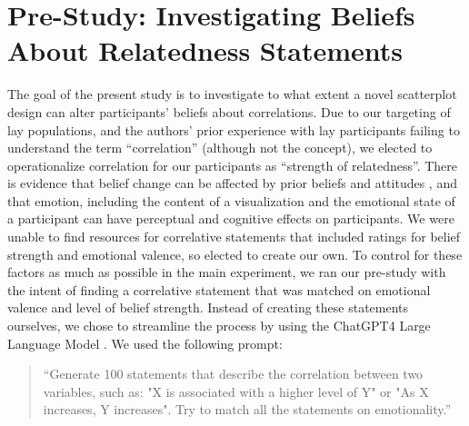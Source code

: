 \documentclass[manuscript,screen,review,anonymous]{acmart}
\begin{document}
\section{Pre-Study: Investigating Beliefs About Relatedness
Statements}\label{sec-pre-study}

The goal of the present study is to investigate to what extent a novel
scatterplot design can alter participants' beliefs about correlations.
Due to our targeting of lay populations, and the authors' prior
experience with lay participants failing to understand the term
``correlation'' (although not the concept), we elected to operationalize
correlation for our participants as ``strength of relatedness''. There
is evidence that belief change can be affected by prior beliefs and
attitudes \citep{xiong_2022, markant_2023}, and that emotion, including
the content of a visualization \citep{phelps_2006, harrison_2013} and
the emotional state of a participant \citep{thoresen_2016} can have
perceptual and cognitive effects on participants. We were unable to find
resources for correlative statements that included ratings for belief
strength and emotional valence, so elected to create our own. To control
for these factors as much as possible in the main experiment, we ran our
pre-study with the intent of finding a correlative statement that was
matched on emotional valence and level of belief strength. Instead of
creating these statements ourselves, we chose to streamline the process
by using the ChatGPT4 Large Language Model \citep{chat_gpt}. We used the
following prompt:

\begin{quotation}
    ``Generate 100 statements that describe the correlation between two variables, such as:
     "X is associated with a higher level of Y" or
     "As X increases, Y increases".
    Try to match all the statements on emotionality.''
    
\end{quotation}
\end{document}
